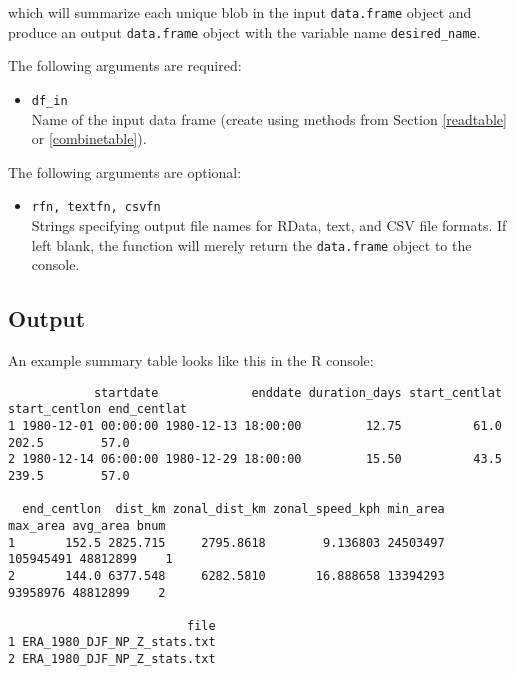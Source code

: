 \documentclass{article}
\begin{document}
which will summarize each unique blob in the input \texttt{data.frame} object and produce an output \texttt{data.frame} object with the variable name \texttt{desired\_name}.

The following arguments are required:
\begin{itemize}
\item[] \texttt{df\_in}\\ Name of the input data frame (create using methods from Section \ref{readtable} or \ref{combinetable}).
\end{itemize}

The following arguments are optional:
\begin{itemize}
\item[] \texttt{rfn, textfn, csvfn}\\Strings specifying output file names for RData, text, and CSV file formats. If left blank, the function will merely return the \texttt{data.frame} object to the console.
\end{itemize}

\subsection{Output}
An example summary table looks like this in the R console:
\begin{verbatim}
            startdate             enddate duration_days start_centlat start_centlon end_centlat
1 1980-12-01 00:00:00 1980-12-13 18:00:00         12.75          61.0         202.5        57.0
2 1980-12-14 06:00:00 1980-12-29 18:00:00         15.50          43.5         239.5        57.0

  end_centlon  dist_km zonal_dist_km zonal_speed_kph min_area  max_area avg_area bnum
1       152.5 2825.715     2795.8618        9.136803 24503497 105945491 48812899    1
2       144.0 6377.548     6282.5810       16.888658 13394293  93958976 48812899    2

                         file
1 ERA_1980_DJF_NP_Z_stats.txt
2 ERA_1980_DJF_NP_Z_stats.txt
\end{verbatim}
\end{document}
